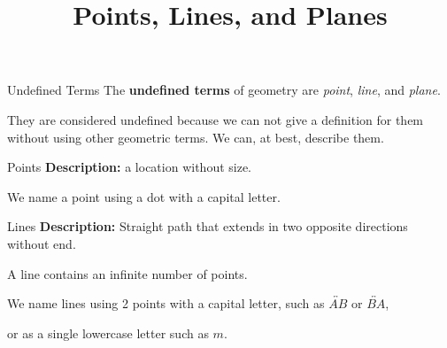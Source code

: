 \documentclass[t]{beamer}
\title{Points, Lines, and Planes}
\author{}
\date{}
\begin{document}
\begin{frame} 
\maketitle
\end{frame}

\begin{frame}{Undefined Terms}
The \textbf{undefined terms} of geometry are \emph{point}, \emph{line}, and \emph{plane}. \newline\\	\pause

They are considered undefined because we can not give a definition for them without using other geometric terms. We can, at best, describe them.
\end{frame}

\begin{frame}{Points}
\textbf{Description:} a location without size.	\newline\\	\pause

We name a point using a dot with a capital letter.	\newline\\	\pause

\begin{center}
\end{center}
\end{frame}

\begin{frame}{Lines}
\textbf{Description:} Straight path that extends in two opposite directions without end. \newline\\	\pause

A line contains an infinite number of points.	\newline\\	\pause

We name lines using 2 points with a capital letter, such as $\overleftrightarrow{AB}$ or $\overleftrightarrow{BA}$,	\newline\\	\pause

\begin{center}
\end{center}
\pause
or as a single lowercase letter such as $m$.
\begin{center}
\end{center}
\end{frame}
\end{document}
